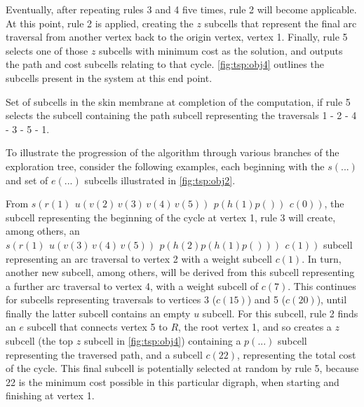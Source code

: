 Eventually, after repeating rules 3 and 4 five times, rule 2 will become applicable.  At this point, rule 2 is applied, creating the \(z\) subcells that represent the final arc traversal from another vertex back to the origin vertex, vertex 1.  Finally, rule 5 selects one of those \(z\) subcells with minimum cost as the solution, and outputs the path and cost subcells relating to that cycle.  \autoref{fig:tsp:obj4} outlines the subcells present in the system at this end point.

\begin{cpobjectsfloat}
\begin{cpobjects}
\end{cpobjects}
\caption[Set of subcells in the skin membrane at completion of the computation]{\label{fig:tsp:obj4}Set of subcells in the skin membrane at completion of the computation, if rule 5 selects the subcell containing the path subcell representing the traversals 1 - 2 - 4 - 3 - 5 - 1.}
\end{cpobjectsfloat}

To illustrate the progression of the algorithm through various branches of the exploration tree, consider the following examples, each beginning with the \(s(...)\) and set of \(e(...)\) subcells illustrated in \autoref{fig:tsp:obj2}.

From \(s(r(1) ~ \,u(v(2)\,v(3)\,v(4)\,v(5))\, ~ p(h(1)p()) ~ \,c(0))\), the subcell representing the beginning of the cycle at vertex 1, rule 3 will create, among others, an \(s(r(1) ~ \,u(v(3)\,v(4)\,v(5)) ~ \,p(h(2)p(h(1)p())) ~ \,c(1))\) subcell representing an arc traversal to vertex 2 with a weight subcell \(c(1)\).  In turn, another new subcell, among others, will be derived from this subcell representing a further arc traversal to vertex 4, with a weight subcell of \(c(7)\).  This continues for subcells representing traversals to vertices 3 (\(c(15)\)) and 5 (\(c(20)\)), until finally the latter subcell contains an empty \(u\) subcell.  For this subcell, rule 2 finds an \(e\) subcell that connects vertex 5 to \(R\), the root vertex 1, and so creates a \(z\) subcell (the top \(z\) subcell in \autoref{fig:tsp:obj4}) containing a \(p(...)\) subcell representing the traversed path, and a subcell \(c(22)\), representing the total cost of the cycle.  This final subcell is potentially selected at random by rule 5, because 22 is the minimum cost possible in this particular digraph, when starting and finishing at vertex 1.

